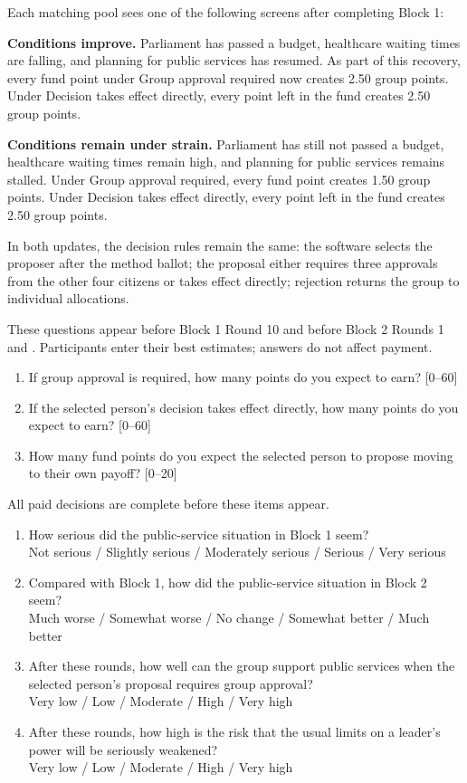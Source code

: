 Each matching pool sees one of the following screens after completing Block 1:

\textbf{Conditions improve.} Parliament has passed a budget, healthcare waiting times are falling, and planning for public services has resumed. As part of this recovery, every fund point under Group approval required now creates 2.50 group points. Under Decision takes effect directly, every point left in the fund creates 2.50 group points.

\textbf{Conditions remain under strain.} Parliament has still not passed a budget, healthcare waiting times remain high, and planning for public services remains stalled. Under Group approval required, every fund point creates 1.50 group points. Under Decision takes effect directly, every point left in the fund creates 2.50 group points.

In both updates, the decision rules remain the same: the software selects the proposer after the method ballot; the proposal either requires three approvals from the other four citizens or takes effect directly; rejection returns the group to individual allocations.

These questions appear before Block 1 Round 10 and before Block 2 Rounds 1 and . Participants enter their best estimates; answers do not affect payment.
\begin{enumerate}
  \item If group approval is required, how many points do you expect to earn? \hfill [0--60]
  \item If the selected person's decision takes effect directly, how many points do you expect to earn? \hfill [0--60]
  \item How many fund points do you expect the selected person to propose moving to their own payoff? \hfill [0--20]
\end{enumerate}

All paid decisions are complete before these items appear.

\begin{enumerate}
  \item How serious did the public-service situation in Block 1 seem?\\
  Not serious / Slightly serious / Moderately serious / Serious / Very serious
  \item Compared with Block 1, how did the public-service situation in Block 2 seem?\\
  Much worse / Somewhat worse / No change / Somewhat better / Much better
  \item After these rounds, how well can the group support public services when the selected person's proposal requires group approval?\\
  Very low / Low / Moderate / High / Very high
  \item After these rounds, how high is the risk that the usual limits on a leader's power will be seriously weakened?\\
  Very low / Low / Moderate / High / Very high
\end{enumerate}

